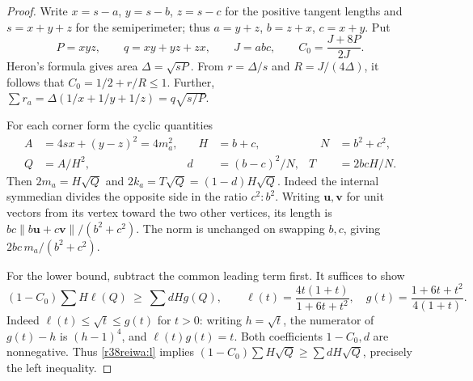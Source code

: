 \documentclass[11pt,a4paper]{article}
\numberwithin{equation}{section}
\theoremstyle{definition}
\theoremstyle{remark}
\begin{document}
\begin{proof}
Write $x=s-a$, $y=s-b$, $z=s-c$ for the positive tangent lengths and $s=x+y+z$ for the semiperimeter; thus $a=y+z$, $b=z+x$, $c=x+y$. Put
\[
 P=xyz,\qquad q=xy+yz+zx,\qquad J=abc,\qquad C_0=\frac{J+8P}{2J}.
\]
Heron's formula gives area $\Delta=\sqrt{sP}$. From $r=\Delta/s$ and $R=J/(4\Delta)$, it follows that $C_0=1/2+r/R\le1$. Further,
$\sum r_a=\Delta(1/x+1/y+1/z)=q\sqrt{s/P}$.

For each corner form the cyclic quantities
\[
 \begin{aligned}
 A&=4sx+(y-z)^2=4m_a^2,&\quad H&=b+c,&\quad N&=b^2+c^2,\\
 Q&=A/H^2,& d&=(b-c)^2/N,& T&=2bcH/N.
\end{aligned}
\]
Then $2m_a=H\sqrt Q$ and $2k_a=T\sqrt Q=(1-d)H\sqrt Q$. Indeed the internal symmedian divides the opposite side in the ratio $c^2:b^2$. Writing $\mathbf u,\mathbf v$ for unit vectors from its vertex toward the two other vertices, its length is $bc\lVert b\mathbf u+c\mathbf v\rVert/(b^2+c^2)$. The norm is unchanged on swapping $b,c$, giving $2bc\,m_a/(b^2+c^2)$.

For the lower bound, subtract the common leading term first. It suffices to show
\begin{equation}\label{r38reiwa:l}
 (1-C_0)\sum H\ell(Q)\ \ge\ \sum dH g(Q),
 \qquad
 \ell(t)=\frac{4t(1+t)}{1+6t+t^2},\quad
 g(t)=\frac{1+6t+t^2}{4(1+t)}.
\end{equation}
Indeed $\ell(t)\le\sqrt t\le g(t)$ for $t>0$: writing $h=\sqrt t$, the numerator of $g(t)-h$ is $(h-1)^4$, and $\ell(t)g(t)=t$. Both coefficients $1-C_0,d$ are nonnegative. Thus \eqref{r38reiwa:l} implies $(1-C_0)\sum H\sqrt Q\ge\sum dH\sqrt Q$, precisely the left inequality.


\end{proof}
\end{document}
